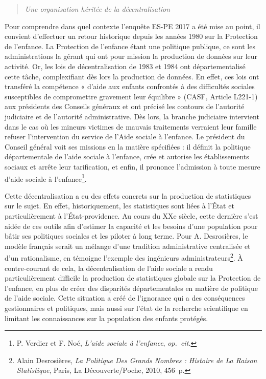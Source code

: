 \documentclass[
  12,
  a4paper,
]{report}
\begin{document}
\begin{quote}
\emph{Une organisation héritée de la décentralisation}
\end{quote}

Pour comprendre dans quel contexte l'enquête ES-PE 2017 a été mise au
point, il convient d'effectuer un retour historique depuis les années
1980 sur la Protection de l'enfance. La Protection de l'enfance étant
une politique publique, ce sont les administrations la gérant qui ont
pour mission la production de données sur leur activité. Or, les lois de
décentralisation de 1983 et 1984 ont départementalisé cette tâche,
complexifiant dès lors la production de données. En effet, ces lois ont
transféré la compétence « d'aide aux enfants confrontés à des
difficultés sociales susceptibles de compromettre gravement leur
équilibre » (CASF, Article L221-1) aux présidents des Conseils généraux
et ont précisé les contours de l'autorité judiciaire et de l'autorité
administrative. Dès lors, la branche judiciaire intervient dans le cas
où les mineurs victimes de mauvais traitements verraient leur famille
refuser l'intervention du service de l'Aide sociale à l'enfance. Le
président du Conseil général voit ses missions en la matière spécifiées
: il définit la politique départementale de l'aide sociale à l'enfance,
crée et autorise les établissements sociaux et arrête leur tarification,
et enfin, il prononce l'admission à toute mesure d'aide sociale à
l'enfance\footnote{P. Verdier et F. Noé, \emph{L'aide sociale à
  l'enfance}, \emph{op.~cit.}}.

Cette décentralisation a eu des effets concrets sur la production de
statistiques sur le sujet. En effet, historiquement, les statistiques
sont liées à l'État et particulièrement à l'État-providence. Au cours du
XXe siècle, cette dernière s'est aidée de ces outils afin d'estimer la
capacité et les besoins d'une population pour bâtir ses politiques
sociales et les piloter à long terme. Pour A. Desrosières, le modèle
français serait un mélange d'une tradition administrative centralisée et
d'un rationalisme, en témoigne l'exemple des ingénieurs
administrateurs\footnote{Alain Desrosières, \emph{La Politique Des
  Grands Nombres : Histoire de La Raison Statistique}, {Paris}, {La
  Découverte/Poche}, 2010, 456~p.}. À contre-courant de cela, la
décentralisation de l'aide sociale a rendu particulièrement difficile la
production de statistiques globale sur la Protection de l'enfance, en
plus de créer des disparités départementales en matière de politique de
l'aide sociale. Cette situation a créé de l'ignorance qui a des
conséquences gestionnaires et politiques, mais aussi sur l'état de la
recherche scientifique en limitant les connaissances sur la population
des enfants protégés.
\end{document}
